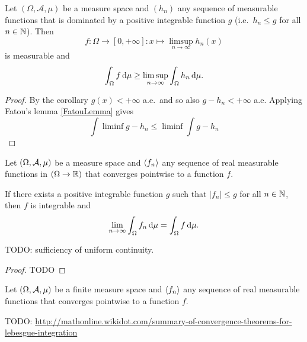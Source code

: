 \begin{proposition}
Let $(\Omega, \mathcal{A}, \mu)$ be a measure space and $(h_n)$ any sequence of measurable functions that is dominated by a positive integrable function $g$ (i.e.\ $h_n\leq g$ for all $n\in\mathbb{N}$). Then
\[ f: \Omega\to[0,+\infty]: x\mapsto \limsup_{n\to\infty}h_n(x) \]
is measurable and
\[ \int_\Omega f\operatorname{d \!}{\mu} \geq \limsup_{n\to\infty}\int_\Omega h_n\operatorname{d \!}{\mu}. \]
\end{proposition}
\begin{proof}
By the corollary $g(x)<+\infty$ a.e.\ and so also $g-h_n<+\infty$ a.e. Applying Fatou's lemma \ref{FatouLemma} gives
\[ \int\liminf g-h_n \leq \liminf\int g-h_n\]
\end{proof}

\begin{theorem} \label{dominatedConvergence}
Let $\sSet{\Omega, \mathcal{A}, \mu}$ be a measure space and $\left\langle f_n \right\rangle$ any sequence of real measurable functions in $(\Omega\to\mathbb{R})$ that converges pointwise to a function $f$.

If there exists a positive integrable function $g$ such that $|f_n| \leq g$ for all $n\in \mathbb{N}$, then $f$ is integrable and
\[ \lim_{n\to \infty}\int_\Omega f_n \operatorname{d \!}{\mu} = \int_\Omega f\operatorname{d \!}{\mu}. \]
\end{theorem}
TODO: sufficiency of uniform continuity.
\begin{proof}
TODO
\end{proof}
\begin{corollary} \label{boundedConvergenceTheorem}
Let $\sSet{\Omega, \mathcal{A}, \mu}$ be a finite measure space and $\left\langle f_n \right\rangle$ any sequence of real measurable functions that converges pointwise to a function $f$.
\end{corollary}
TODO: \url{http://mathonline.wikidot.com/summary-of-convergence-theorems-for-lebesgue-integration}


